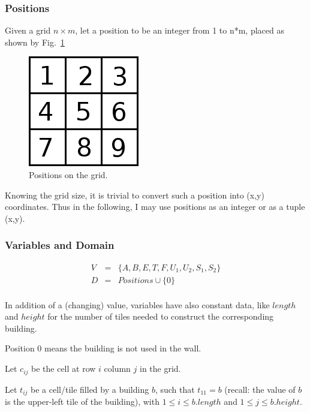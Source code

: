 \documentclass[a4paper,11pt]{article}
\begin{document}
\subsubsection{Positions}

Given a grid $n  \times m$, let a position to be  an integer from 1 to
n*m, placed as shown by Fig.~\ref{figs:positions}

\begin{figure}[!h]
  \centering
  \includegraphics[width=.3\linewidth]{figs/positions}
  \caption{Positions on the grid.}
  \label{figs:positions}
\end{figure}

Knowing the grid  size, it is trivial to convert  such a position into
(x,y) coordinates.  Thus in the following,  I may use  positions as an
integer or as a tuple (x,y).

\subsubsection{Variables and Domain}

\begin{displaymath}
  \begin{array}{ccc}
    V & = & \{A, B, E, T, F, U_1, U_2, S_1, S_2\}\\
    D & = & Positions \cup \{0\}\\
  \end{array}
\end{displaymath}

In addition of a (changing)  value, variables have also constant data,
like $length$ and $height$ for the number of tiles needed to construct
the corresponding building.

Position $0$  means the building is  not used in  the wall.

Let $c_{ij}$ be the cell at row $i$ column $j$ in the grid.

Let  $t_{ij}$ be  a  cell/tile filled  by  a building  $b$, such  that
$t_{11} = b$  (recall: the value of $b$ is the  upper-left tile of the
building), with $1 \leq i \leq b.length$ and $1 \leq j \leq b.height$.
\end{document}

